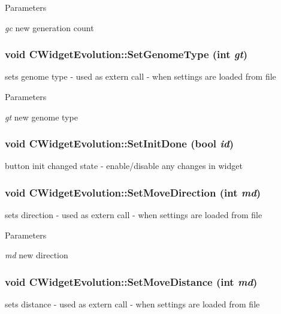 \begin{DoxyParams}{Parameters}
\item[{\em gc}]new generation count \end{DoxyParams}
\hypertarget{classCWidgetEvolution_ac81c258deaf2e7e58c197ec9e729fae1}{
\subsubsection[{SetGenomeType}]{\setlength{\rightskip}{0pt plus 5cm}void CWidgetEvolution::SetGenomeType (int {\em gt})}}
\label{classCWidgetEvolution_ac81c258deaf2e7e58c197ec9e729fae1}
sets genome type -\/ used as extern call -\/ when settings are loaded from file


\begin{DoxyParams}{Parameters}
\item[{\em gt}]new genome type \end{DoxyParams}
\hypertarget{classCWidgetEvolution_aeb3ae4928b09eed819d3c3e7562848ac}{
\subsubsection[{SetInitDone}]{\setlength{\rightskip}{0pt plus 5cm}void CWidgetEvolution::SetInitDone (bool {\em id})}}
\label{classCWidgetEvolution_aeb3ae4928b09eed819d3c3e7562848ac}
button init changed state -\/ enable/disable any changes in widget \hypertarget{classCWidgetEvolution_a0d953499ba4929e231f649881e8324f9}{
\subsubsection[{SetMoveDirection}]{\setlength{\rightskip}{0pt plus 5cm}void CWidgetEvolution::SetMoveDirection (int {\em md})}}
\label{classCWidgetEvolution_a0d953499ba4929e231f649881e8324f9}
sets direction -\/ used as extern call -\/ when settings are loaded from file


\begin{DoxyParams}{Parameters}
\item[{\em md}]new direction \end{DoxyParams}
\hypertarget{classCWidgetEvolution_a62380d2dc516f8c8da4448a2129f2de7}{
\subsubsection[{SetMoveDistance}]{\setlength{\rightskip}{0pt plus 5cm}void CWidgetEvolution::SetMoveDistance (int {\em md})}}
\label{classCWidgetEvolution_a62380d2dc516f8c8da4448a2129f2de7}
sets distance -\/ used as extern call -\/ when settings are loaded from file



